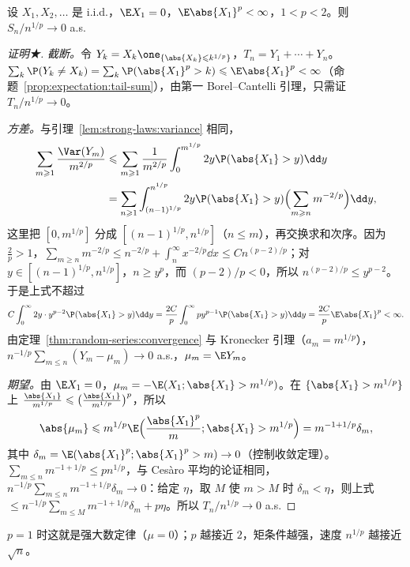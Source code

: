 \begin{theorem}\label{thm:random-series:mz}
设 $X_1,X_2,\dots$ 是 i.i.d.，$\E X_1=0$，$\E\abs{X_1}^p<\infty$，$1<p<2$。则 $S_n/n^{1/p}\to0$ a.s.
\end{theorem}
\begin{proof}[证明★]
\emph{截断。}令 $Y_k=X_k\one_{\{\abs{X_k}\leqslant k^{1/p}\}}$，$T_n=Y_1+\cdots+Y_n$。$\sum_k\P(Y_k\neq X_k)=\sum_k\P(\abs{X_1}^p>k)\leqslant \E\abs{X_1}^p<\infty$（命题~\ref{prop:expectation:tail-sum}），由第一 Borel--Cantelli 引理，只需证 $T_n/n^{1/p}\to0$。

\emph{方差。}与引理~\ref{lem:strong-laws:variance} 相同，
\[
\begin{aligned}
\sum_{m\geqslant1}\frac{\Var(Y_m)}{m^{2/p}}&\leqslant\sum_{m\geqslant1}\frac1{m^{2/p}}\int_0^{m^{1/p}}2y\P(\abs{X_1}>y)\dd y\\
&=\sum_{n\geqslant1}\int_{(n-1)^{1/p}}^{n^{1/p}}2y\P(\abs{X_1}>y)\Bigl(\sum_{m\geqslant n}m^{-2/p}\Bigr)\dd y,
\end{aligned}
\]
这里把 $[0,m^{1/p}]$ 分成 $[(n-1)^{1/p},n^{1/p}]$（$n\leqslant m$），再交换求和次序。因为 $\frac2p>1$，$\sum_{m\geqslant n}m^{-2/p}\leqslant n^{-2/p}+\int_n^\infty x^{-2/p}\dd x\leqslant Cn^{(p-2)/p}$；对 $y\in[(n-1)^{1/p},n^{1/p}]$，$n\geqslant y^p$，而 $(p-2)/p<0$，所以 $n^{(p-2)/p}\leqslant y^{p-2}$。于是上式不超过
\[
C\int_0^\infty2y\cdot y^{p-2}\P(\abs{X_1}>y)\dd y=\frac{2C}p\int_0^\infty py^{p-1}\P(\abs{X_1}>y)\dd y=\frac{2C}p\E\abs{X_1}^p<\infty .
\]
由定理~\ref{thm:random-series:convergence} 与 Kronecker 引理（$a_m=m^{1/p}$），$n^{-1/p}\sum_{m\leqslant n}(Y_m-\mu_m)\to0$ a.s.，$\mu_m=\E Y_m$。

\emph{期望。}由 $\E X_1=0$，$\mu_m=-\E(X_1;\abs{X_1}>m^{1/p})$。在 $\{\abs{X_1}>m^{1/p}\}$ 上 $\frac{\abs{X_1}}{m^{1/p}}\leqslant\bigl(\frac{\abs{X_1}}{m^{1/p}}\bigr)^p$，所以
\[
\abs{\mu_m}\leqslant m^{1/p}\E\Bigl(\frac{\abs{X_1}^p}m;\abs{X_1}>m^{1/p}\Bigr)=m^{-1+1/p}\delta_m,
\]
其中 $\delta_m=\E(\abs{X_1}^p;\abs{X_1}^p>m)\to0$（控制收敛定理）。$\sum_{m\leqslant n}m^{-1+1/p}\leqslant pn^{1/p}$，与 Cesàro 平均的论证相同，$n^{-1/p}\sum_{m\leqslant n}m^{-1+1/p}\delta_m\to0$：给定 $\eta$，取 $M$ 使 $m>M$ 时 $\delta_m<\eta$，则上式 $\leqslant n^{-1/p}\sum_{m\leqslant M}m^{-1+1/p}\delta_m+p\eta$。所以 $T_n/n^{1/p}\to0$ a.s.
\end{proof}

$p=1$ 时这就是强大数定律（$\mu=0$）；$p$ 越接近 $2$，矩条件越强，速度 $n^{1/p}$ 越接近 $\sqrt n$。


